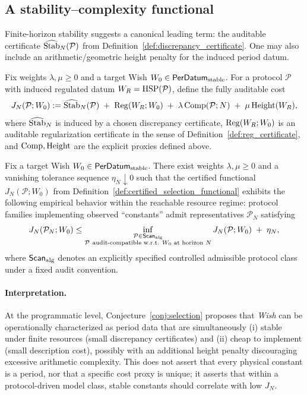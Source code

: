 \subsection{A stability--complexity functional}
\label{sec:selection_functional}

Finite-horizon stability suggests a canonical leading term: the auditable certificate $\widehat{\mathrm{Stab}}_N(\mathcal{P})$ from Definition~\ref{def:discrepancy_certificate}.
One may also include an arithmetic/geometric height penalty for the induced period datum.

\begin{definition}
\label{def:certified_selection_functional}
Fix weights $\lambda,\mu\ge 0$ and a target Wish $W_0\in\mathsf{PerDatum}_{\mathrm{stable}}$.
For a protocol $\mathcal{P}$ with induced regulated datum $W_R=\mathrm{HSP}(\mathcal{P})$, define the fully auditable cost
\[
J_N(\mathcal{P};W_0)
:=
\widehat{\mathrm{Stab}}_N(\mathcal{P})
\;+\;
\mathrm{Reg}(W_R;W_0)
\;+\;
\lambda\,\mathrm{Comp}(\mathcal{P};N)
\;+\;
\mu\,\mathrm{Height}(W_R),
\]
where $\widehat{\mathrm{Stab}}_N$ is induced by a chosen discrepancy certificate, $\mathrm{Reg}(W_R;W_0)$ is an auditable regularization certificate in the sense of Definition~\ref{def:reg_certificate}, and $\mathrm{Comp},\mathrm{Height}$ are the explicit proxies defined above.
\end{definition}

\begin{conjecture}
\label{conj:selection}
Fix a target Wish $W_0\in\mathsf{PerDatum}_{\mathrm{stable}}$.
There exist weights $\lambda,\mu\ge 0$ and a vanishing tolerance sequence $\eta_N\downarrow 0$ such that the certified functional $J_N(\mathcal{P};W_0)$ from Definition~\ref{def:certified_selection_functional} exhibits the following empirical behavior within the reachable resource regime:
protocol families implementing observed ``constants'' admit representatives $\mathcal{P}_N$ satisfying
\[
J_N(\mathcal{P}_N;W_0)
\le
\inf_{\substack{\mathcal{P}\in\ScanAlg\\\mathcal{P}\ \text{audit-compatible w.r.t. }W_0\text{ at horizon }N}} J_N(\mathcal{P};W_0)
\;+\;
\eta_N,
\]
where $\mathsf{Scan}_{\mathrm{alg}}$ denotes an explicitly specified controlled admissible protocol class under a fixed audit convention.
\end{conjecture}

\paragraph{Interpretation.}
At the programmatic level, Conjecture~\ref{conj:selection} proposes that \emph{Wish} can be operationally characterized as period data that are simultaneously (i) stable under finite resources (small discrepancy certificates) and (ii) cheap to implement (small description cost), possibly with an additional height penalty discouraging excessive arithmetic complexity.
This does not assert that every physical constant is a period, nor that a specific cost proxy is unique; it asserts that within a protocol-driven model class, stable constants should correlate with low $J_N$.


